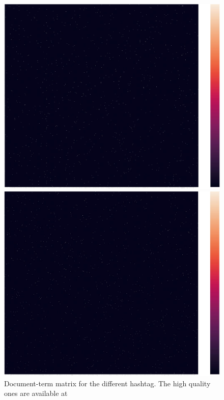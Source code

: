 \documentclass[12pt,%
               a4paper,%
               oneside,openany,%
               titlepage,%
               headinclude,footinclude,%
               BCOR5mm,%
               cleardoublepage=empty,%
               tablecaptionabove,%
               floatperchapter,
               ]{scrreprt}                 %
\begin{document}
\begin{figure}[ht]
  \begin{minipage}[b]{0.5\linewidth}
    \centering
    \includegraphics[width=.9\linewidth]{Figures/Matrix_vaccine.jpg}
    \vspace{4ex}
  \end{minipage}
  \begin{minipage}[b]{0.5\linewidth}
    \centering
    \includegraphics[width=.9\linewidth]{Figures/Matrix_freedom.jpg}
    \vspace{4ex}
  \end{minipage}

\caption{Document-term matrix for the different hashtag. The high quality ones are available at \cite{Folder}}
\label{Matrix_ALL}
\end{figure}
\end{document}
